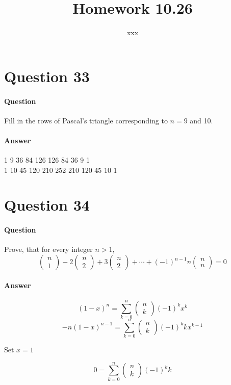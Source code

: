 \documentclass[UTF8]{article}
\title{Homework 10.26}
\author{xxx}
\begin{document}
\maketitle
\section{Question 33}
\paragraph{Question}
Fill in the rows of Pascal’s triangle corresponding to $n = 9$ and 10.
\paragraph{Answer}
\begin{center}
    1 9 36 84 126 126 84 36 9 1 \\
    1 10 45 120 210 252 210 120 45 10 1 \\
\end{center}
\section{Question 34}
\paragraph{Question}
Prove, that for every integer $n > 1$,
$$\begin{pmatrix} n \\ 1 \end{pmatrix} 
- 2\begin{pmatrix} n \\ 2 \end{pmatrix}
+ 3\begin{pmatrix} n \\ 2 \end{pmatrix}
+ \cdots +
\left( -1\right)^{n-1}n\begin{pmatrix} n \\ n \end{pmatrix}
 = 0
$$
\paragraph{Answer}
$$ \left(1-x\right)^n = \sum_{k=0}^{n}\begin{pmatrix} n \\ k \end{pmatrix} \left(-1\right)^{k} x^{k}$$
$$ -n\left(1-x\right)^{n-1} = \sum_{k=0}^{n}\begin{pmatrix} n \\ k \end{pmatrix} \left(-1\right)^{k} kx^{k-1}$$
\begin{center}
    Set $x = 1$
\end{center}
$$ 0 = \sum_{k=0}^{n}\begin{pmatrix} n \\ k \end{pmatrix} \left(-1\right)^{k} k$$
\end{document}
